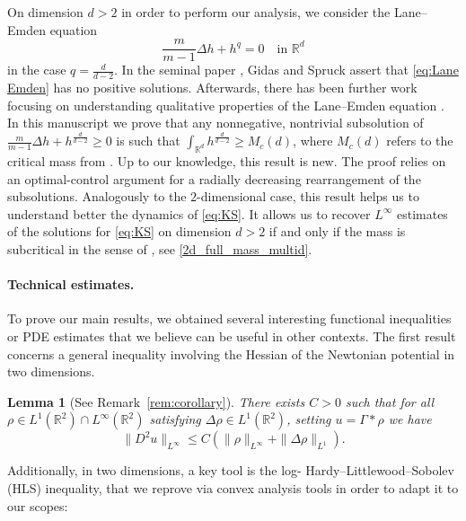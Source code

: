 \documentclass[11pt,a4paper]{article}
\numberwithin{equation}{section}
\newcommand{\R}{{\mathbb{R}}}
\newcommand{\Rd}{{\R^d}}
\theoremstyle{plain}
\newtheorem{lemma}[theorem]{Lemma}
\theoremstyle{remark}
\begin{document}
On dimension $d > 2$ in order to perform our analysis, we consider the Lane--Emden equation
\begin{equation}\label{eq:Lane Emden}
    \frac{m}{m-1}\Delta h + h^q = 0 \quad \text{in } \Rd
\end{equation}
in the case $q = \frac{d}{d-2}$. In the seminal paper \cite{Gidas_Spruck81}, Gidas and Spruck assert that \eqref{eq:Lane Emden} has no positive solutions. Afterwards, there has been further work focusing on understanding qualitative properties of the Lane--Emden equation \cite{Bahri_Lions92,  Berestycki_Caffarelli_Nirenberg97, Farina07}. In this manuscript we prove that any nonnegative, nontrivial subsolution of $\frac{m}{m-1}\Delta h + h^{\frac{d}{d-2}} \geq 0$ is such that $\int_{\Rd} h^{\frac{d}{d-2}} \geq M_c (d)$, where $M_c (d)$ refers to the critical mass from . Up to our knowledge, this result is new. The proof relies on an optimal-control argument for a radially decreasing rearrangement of the subsolutions. Analogously to the $2$-dimensional case, this result helps us to understand better the dynamics of \eqref{eq:KS}. It allows us to recover $L^\infty$ estimates of the solutions for \eqref{eq:KS} on dimension $d > 2$ if and only if the mass is subcritical in the sense of , see \ref{2d_full_mass_multid}.

\paragraph{Technical estimates.}

To prove our main results, we obtained several interesting functional inequalities or PDE estimates that we believe can be useful in other contexts. The first result concerns a general inequality involving the Hessian of the Newtonian potential in two dimensions.

\begin{lemma}[See Remark~\ref{rem:corollary}]
There exists $C>0$ such that for all $\rho\in L^{1}(\R^2)\cap L^{\infty}(\R^2)$ satisfying $\Delta\rho\in L^{1}(\R^2)$, setting $u=\Gamma*\rho$ we have
$$
\|D^2 u\|_{L^{\infty}}\le C \left(\|\rho\|_{L^{\infty}} +\|\Delta\rho\|_{L^{1}}\right).
$$

\end{lemma}

Additionally, in two dimensions, a key tool is the log- Hardy--Littlewood--Sobolev (HLS) inequality, that we reprove via convex analysis tools in order to adapt it to our scopes:
\end{document}
